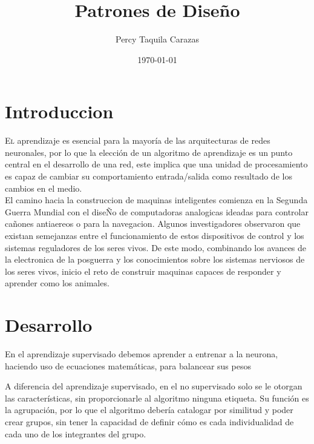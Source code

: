 \documentclass[twoside,twocolumn]{article}
\title{Patrones de Diseño}
\author{Percy Taquila Carazas}
\date{\today}
\begin{document}
\maketitle


\section{Introduccion}

\lettrine[nindent=0em,lines=3]{E}l aprendizaje es esencial para la mayoría de las arquitecturas de redes neuronales, por lo que la elección de un algoritmo de aprendizaje es un punto central en el desarrollo de una red, este implica que una unidad de procesamiento es capaz de cambiar su comportamiento entrada/salida
como resultado de los cambios en el medio.\\

El camino hacia la construccion de maquinas inteligentes comienza en la Segunda Guerra Mundial con el diseÑo de computadoras analogicas ideadas para controlar cañones antiaereos o para la navegacion.
Algunos investigadores observaron que existıan semejanzas entre el funcionamiento de estos dispositivos de control y los sistemas reguladores de los seres vivos. De este modo, combinando los avances de la electronica de la posguerra y los conocimientos sobre los sistemas nerviosos de los seres vivos, inicio el reto de construir maquinas capaces de responder y aprender como los animales.






\section{Desarrollo}
En el aprendizaje supervisado debemos aprender a entrenar a la neurona, haciendo uso de ecuaciones matemáticas, para balancear sus pesos

A diferencia del aprendizaje supervisado, en el no supervisado solo se le otorgan las características, sin proporcionarle al algoritmo ninguna etiqueta. Su función es la agrupación, por lo que el algoritmo debería catalogar por similitud y poder crear grupos, sin tener la capacidad de definir cómo es cada individualidad de cada uno de los integrantes del grupo.
\end{document}
